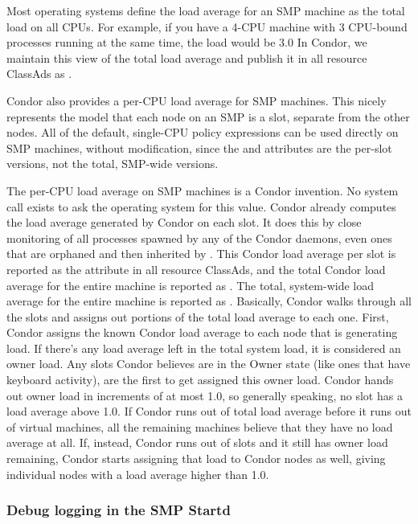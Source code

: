 Most operating systems define the load average for an SMP machine as
the total load on all CPUs.
For example, if you have a 4-CPU machine with 3 CPU-bound processes
running at the same time, the load would be 3.0
In Condor, we maintain this view of the total load average and publish
it in all resource ClassAds as .

Condor also provides a per-CPU load average for SMP machines.
This nicely represents the model that each node on an SMP is a slot,
separate from the other nodes.
All of the default, single-CPU policy expressions can be used directly
on SMP machines, without modification, since the  and
 attributes are the per-slot versions,
not the total, SMP-wide versions.

The per-CPU load average on SMP machines is a Condor invention. 
No system call exists to ask the operating system for this value.
Condor already computes the load average generated by Condor on each
slot.
It does this by close monitoring of all processes spawned by any of the
Condor daemons, even ones that are orphaned and then inherited by
. 
This Condor load average per slot is reported as
the attribute
 in all resource ClassAds, and the total Condor
load average for the entire machine is reported as
. 
The total, system-wide load average for the entire
machine  is reported as .
Basically, Condor walks through all the slots and assigns out
portions of the total load average to each one. 
First, Condor assigns the known Condor load average to each node that
is generating load.  
If there's any load average left in the total system load, it is
considered an owner load.
Any slots Condor believes are in the Owner state (like
ones that have keyboard activity), are the first to get assigned
this owner load.
Condor hands out owner load in increments of at most 1.0, so generally
speaking, no slot has a load average above 1.0.
If Condor runs out of total load average before it runs out of virtual
machines, all the remaining machines believe that they have no load average
at all.
If, instead, Condor runs out of slots and it still has owner
load remaining, Condor starts assigning that load to Condor nodes as
well,
giving individual nodes with a load average higher than 1.0.


\subsubsection{\label{sec:SMP-logging}
Debug logging in the SMP Startd}

